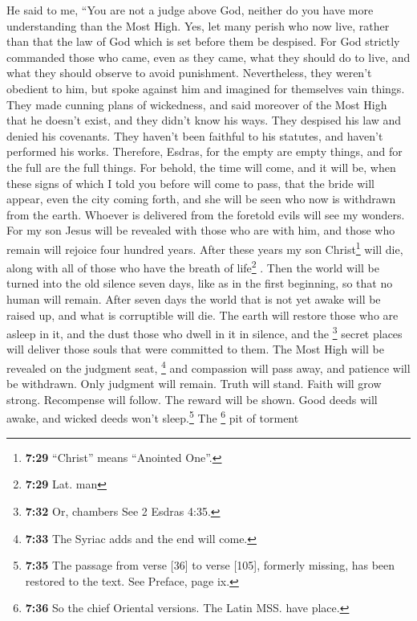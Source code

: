  He said to me, ``You are not a judge above God, neither
do you have more understanding than the Most High.  Yes,
let many perish who now live, rather than that the law of God which is
set before them be despised.  For God strictly commanded
those who came, even as they came, what they should do to live, and what
they should observe to avoid punishment.  Nevertheless,
they weren't obedient to him, but spoke against him and imagined for
themselves vain things.  They made cunning plans of
wickedness, and said moreover of the Most High that he doesn't exist,
and they didn't know his ways.  They despised his law and
denied his covenants. They haven't been faithful to his statutes, and
haven't performed his works.  Therefore, Esdras, for the
empty are empty things, and for the full are the full things.
 For behold, the time will come, and it will be, when
these signs of which I told you before will come to pass, that the bride
will appear, even the city coming forth, and she will be seen who now is
withdrawn from the earth.  Whoever is delivered from the
foretold evils will see my wonders.  For my son Jesus
will be revealed with those who are with him, and those who remain will
rejoice four hundred years.  After these years my son
Christ\footnote{\textbf{7:29} ``Christ'' means ``Anointed One''.} will
die, along with all of those who have the breath of life\footnote{\textbf{7:29}
  Lat. man} .  Then the world will be turned into the old
silence seven days, like as in the first beginning, so that no human
will remain.  After seven days the world that is not yet
awake will be raised up, and what is corruptible will die.
 The earth will restore those who are asleep in it, and
the dust those who dwell in it in silence, and the \footnote{\textbf{7:32}
  Or, chambers See 2 Esdras 4:35.} secret places will deliver those
souls that were committed to them.  The Most High will be
revealed on the judgment seat, \footnote{\textbf{7:33} The Syriac adds
  and the end will come.} and compassion will pass away, and patience
will be withdrawn.  Only judgment will remain. Truth will
stand. Faith will grow strong.  Recompense will follow.
The reward will be shown. Good deeds will awake, and wicked deeds won't
sleep.\footnote{\textbf{7:35} The passage from verse {[}36{]} to verse
  {[}105{]}, formerly missing, has been restored to the text. See
  Preface, page ix.}  The \footnote{\textbf{7:36} So the
  chief Oriental versions. The Latin MSS. have place.} pit of torment

